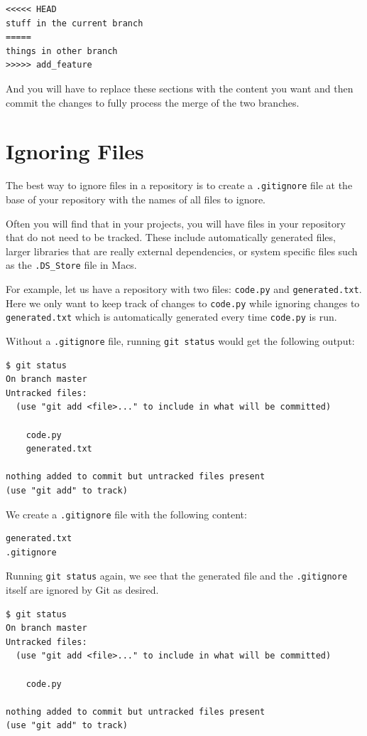 \documentclass{amsart}
\begin{document}
\begin{verbatim}
<<<<< HEAD
stuff in the current branch
=====
things in other branch
>>>>> add_feature
\end{verbatim}	

And you will have to replace these sections with the content you want and then commit the changes to fully process the merge of the two branches.

\newpage
\section*{Ignoring Files}

The best way to ignore files in a repository is to create a \texttt{.gitignore} file at the base of your repository with the names of all files to ignore.

Often you will find that in your projects, you will have files in your repository that do not need to be tracked.  These include automatically generated files, larger libraries that are really external dependencies, or system specific files such as the \texttt{.DS\_Store} file in Macs.

For example, let us have a repository with two files: \texttt{code.py} and \texttt{generated.txt}.  Here we only want to keep track of changes to \texttt{code.py} while ignoring changes to \texttt{generated.txt} which is automatically generated every time \texttt{code.py} is run.

Without a \texttt{.gitignore} file, running \texttt{git status} would get the following output:

\begin{verbatim}
$ git status
On branch master
Untracked files:
  (use "git add <file>..." to include in what will be committed)
  
    code.py
    generated.txt

nothing added to commit but untracked files present
(use "git add" to track)
\end{verbatim}

We create a \texttt{.gitignore} file with the following content:

\begin{verbatim}
generated.txt
.gitignore
\end{verbatim}

Running \texttt{git status} again, we see that the generated file and the \texttt{.gitignore} itself are ignored by Git as desired.

\begin{verbatim}
$ git status
On branch master
Untracked files:
  (use "git add <file>..." to include in what will be committed)
  
    code.py

nothing added to commit but untracked files present
(use "git add" to track)
\end{verbatim}
\end{document}

